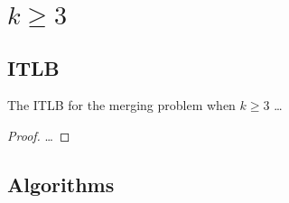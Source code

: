 \section{$k\geq3$}
\label{tree:merging:kgeq3}


\subsection{ITLB}
\label{tree:merging:kgeq3:ITLB}


\begin{theorem}
The ITLB for the merging problem when $k \geq 3$ \dots
\end{theorem}

\begin{proof}
\dots
\end{proof}


\subsection{Algorithms}
\label{tree:merging:kgeq3:alg}